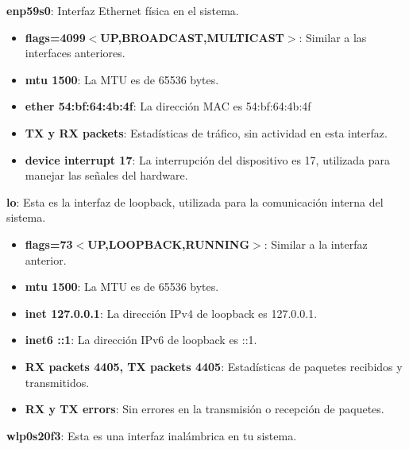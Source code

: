 \begin{itemize}
    \textbf{enp59s0}: Interfaz Ethernet física en el sistema.
    
    \begin{itemize}
        \item \textbf{flags=4099$<$UP,BROADCAST,MULTICAST$>$}:  Similar a las interfaces anteriores.\\
        \item \textbf{mtu 1500}: La MTU es de 65536 bytes.\\
        \item \textbf{ether 54:bf:64:4b:4f}: La dirección MAC es 54:bf:64:4b:4f\\
        \item \textbf{TX y RX packets}: Estadísticas de tráfico, sin actividad en esta interfaz.
        \item \textbf{device interrupt 17}: La interrupción del dispositivo es 17, utilizada para manejar las señales del hardware.\\
    \end{itemize}

    \textbf{lo}: Esta es la interfaz de loopback, utilizada para la comunicación interna del sistema.
    
    \begin{itemize}
        \item \textbf{flags=73$<$UP,LOOPBACK,RUNNING$>$}:  Similar a la interfaz anterior.\\
        \item \textbf{mtu 1500}: La MTU es de 65536 bytes.\\
        \item \textbf{inet 127.0.0.1}: La dirección IPv4 de loopback es 127.0.0.1.\\
        \item \textbf{inet6 ::1}: La dirección IPv6 de loopback es ::1.\\
        \item \textbf{RX packets 4405, TX packets 4405}: Estadísticas de paquetes recibidos y transmitidos.\\
        \item \textbf{RX y TX errors}: Sin errores en la transmisión o recepción de paquetes.\\
    \end{itemize}

    \textbf{wlp0s20f3}: Esta es una interfaz inalámbrica en tu sistema.
    

\end{itemize}

